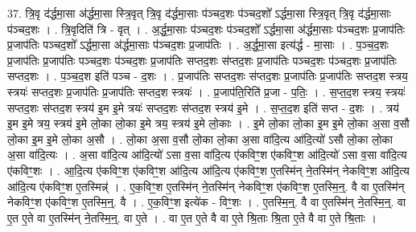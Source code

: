 \documentclass[17pt]{extarticle}
\begin{document}
37. त्रि॒वृ द॑र्द्धमा॒सा अ॑र्द्धमा॒सा स्त्रि॒वृत् त्रि॒वृ द॑र्द्धमा॒साः प॑ञ्चद॒शः प॑ञ्चद॒शो᳚ ऽर्द्धमा॒सा स्त्रि॒वृत् त्रि॒वृ द॑र्द्धमा॒साः प॑ञ्चद॒शः । . त्रि॒वृदिति॑ त्रि - वृत् । . अ॒र्द्ध॒मा॒साः प॑ञ्चद॒शः प॑ञ्चद॒शो᳚ ऽर्द्धमा॒सा अ॑र्द्धमा॒साः प॑ञ्चद॒शः प्र॒जाप॑तिः प्र॒जाप॑तिः पञ्चद॒शो᳚ ऽर्द्धमा॒सा अ॑र्द्धमा॒साः प॑ञ्चद॒शः प्र॒जाप॑तिः । . अ॒र्द्ध॒मा॒सा इत्य॑र्द्ध - मा॒साः । . प॒ञ्च॒द॒शः प्र॒जाप॑तिः प्र॒जाप॑तिः पञ्चद॒शः प॑ञ्चद॒शः प्र॒जाप॑तिः सप्तद॒शः स॑प्तद॒शः प्र॒जाप॑तिः पञ्चद॒शः प॑ञ्चद॒शः प्र॒जाप॑तिः सप्तद॒शः । . प॒ञ्च॒द॒श इति॑ पञ्च - द॒शः । . प्र॒जाप॑तिः सप्तद॒शः स॑प्तद॒शः प्र॒जाप॑तिः प्र॒जाप॑तिः सप्तद॒श स्त्रय॒ स्त्रयः॑ सप्तद॒शः प्र॒जाप॑तिः प्र॒जाप॑तिः सप्तद॒श स्त्रयः॑ । . प्र॒जाप॑ति॒रिति॑ प्र॒जा - प॒तिः॒ । . स॒प्त॒द॒श स्त्रय॒ स्त्रयः॑ सप्तद॒शः स॑प्तद॒श स्त्रय॑ इ॒म इ॒मे त्रयः॑ सप्तद॒शः स॑प्तद॒श स्त्रय॑ इ॒मे । . स॒प्त॒द॒श इति॑ सप्त - द॒शः । . त्रय॑ इ॒म इ॒मे त्रय॒ स्त्रय॑ इ॒मे लो॒का लो॒का इ॒मे त्रय॒ स्त्रय॑ इ॒मे लो॒काः । . इ॒मे लो॒का लो॒का इ॒म इ॒मे लो॒का अ॒सा व॒सौ लो॒का इ॒म इ॒मे लो॒का अ॒सौ । . लो॒का अ॒सा व॒सौ लो॒का लो॒का अ॒सा वा॑दि॒त्य आ॑दि॒त्यो॑ ऽसौ लो॒का लो॒का अ॒सा वा॑दि॒त्यः । . अ॒सा वा॑दि॒त्य आ॑दि॒त्यो॑ ऽसा व॒सा वा॑दि॒त्य ए॑कविꣳ॒॒श ए॑कविꣳ॒॒श आ॑दि॒त्यो॑ ऽसा व॒सा वा॑दि॒त्य ए॑कविꣳ॒॒शः । . आ॒दि॒त्य ए॑कविꣳ॒॒श ए॑कविꣳ॒॒श आ॑दि॒त्य आ॑दि॒त्य ए॑कविꣳ॒॒श ए॒तस्मि॑न् ने॒तस्मि॑न् नेकविꣳ॒॒श आ॑दि॒त्य आ॑दि॒त्य ए॑कविꣳ॒॒श ए॒तस्मिन्न्॑ । . ए॒क॒विꣳ॒॒श ए॒तस्मि॑न् ने॒तस्मि॑न् नेकविꣳ॒॒श ए॑कविꣳ॒॒श ए॒तस्मि॒न्॒. वै वा ए॒तस्मि॑न् नेकविꣳ॒॒श ए॑कविꣳ॒॒श ए॒तस्मि॒न्॒. वै । . ए॒क॒विꣳ॒॒श इत्ये॑क - विꣳ॒॒शः । . ए॒तस्मि॒न्॒. वै वा ए॒तस्मि॑न् ने॒तस्मि॒न्॒. वा ए॒त ए॒ते वा ए॒तस्मि॑न् ने॒तस्मि॒न्॒. वा ए॒ते । . वा ए॒त ए॒ते वै वा ए॒ते श्रि॒ताः श्रि॒ता ए॒ते वै वा ए॒ते श्रि॒ताः । \newline
\end{document}
